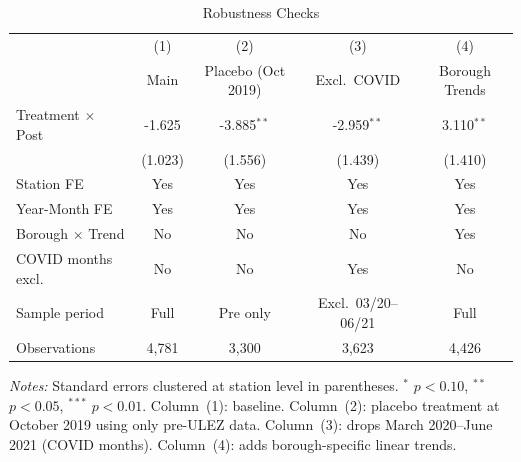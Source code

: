 \begin{table}[H]
\centering
\caption{Robustness Checks}
\label{tab:robustness}
\begin{threeparttable}
\footnotesize
\begin{tabular}{lcccc}
\toprule
 & (1) & (2) & (3) & (4) \\
 & Main & Placebo (Oct 2019) & Excl.\ COVID & Borough Trends \\
\midrule
Treatment $\times$ Post & -1.625 & -3.885$^{**}$ & -2.959$^{**}$ & 3.110$^{**}$ \\
 & (1.023) & (1.556) & (1.439) & (1.410) \\
\addlinespace
Station FE & Yes & Yes & Yes & Yes \\
Year-Month FE & Yes & Yes & Yes & Yes \\
Borough $\times$ Trend & No & No & No & Yes \\
COVID months excl. & No & No & Yes & No \\
Sample period & Full & Pre only & Excl.\ 03/20--06/21 & Full \\
Observations & 4,781 & 3,300 & 3,623 & 4,426 \\
\bottomrule
\end{tabular}
\begin{tablenotes}[flushleft]
\footnotesize\sloppy
\item \textit{Notes:} Standard errors clustered at station level in parentheses. $^{*}$ $p<0.10$, $^{**}$ $p<0.05$, $^{***}$ $p<0.01$. Column~(1): baseline. Column~(2): placebo treatment at October 2019 using only pre-ULEZ data. Column~(3): drops March 2020--June 2021 (COVID months). Column~(4): adds borough-specific linear trends.
\end{tablenotes}
\end{threeparttable}
\end{table}
